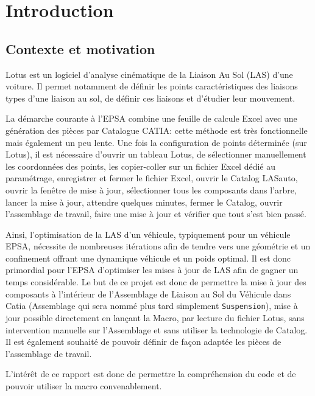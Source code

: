 \section{Introduction}

\subsection{Contexte et motivation} %

\par Lotus est un logiciel d'analyse cinématique de la Liaison Au Sol (LAS) d'une voiture. Il permet notamment de définir les points caractéristiques des liaisons types d'une liaison au sol, de définir ces liaisons et d'étudier leur mouvement.

\par La démarche courante à l'EPSA combine une feuille de calcule Excel avec une génération des pièces par Catalogue CATIA:  cette méthode est très fonctionnelle mais également un peu lente. Une fois la configuration de points déterminée (sur Lotus), il est nécessaire d'ouvrir un tableau Lotus, de sélectionner manuellement les coordonnées des points, les copier-coller sur un fichier Excel dédié au paramétrage, enregistrer et fermer le fichier Excel, ouvrir le Catalog LASauto, ouvrir la fenêtre de mise à jour, sélectionner tous les composants dans l'arbre, lancer la mise à jour, attendre quelques minutes, fermer le Catalog, ouvrir l'assemblage de travail, faire une mise à jour et vérifier que tout s'est bien passé.

\par Ainsi, l'optimisation de la LAS d'un véhicule, typiquement pour un véhicule EPSA, nécessite de nombreuses itérations afin de tendre vers une géométrie et un confinement offrant une dynamique véhicule et un poids optimal. Il est donc primordial pour l'EPSA d'optimiser les mises à jour de LAS afin de gagner un temps considérable. Le but de ce projet est donc de permettre la mise à jour des composants à l'intérieur de l'Assemblage de Liaison au Sol du Véhicule dans Catia (Assemblage qui sera nommé plus tard simplement \texttt{Suspension}), mise à jour possible directement en lançant la Macro, par lecture du fichier Lotus, sans intervention manuelle sur l'Assemblage et sans utiliser la technologie de Catalog. Il est également souhaité de pouvoir définir de façon adaptée les pièces de l'assemblage de travail.

\par L'intérêt de ce rapport est donc de permettre la compréhension du code et de pouvoir utiliser la macro convenablement.


